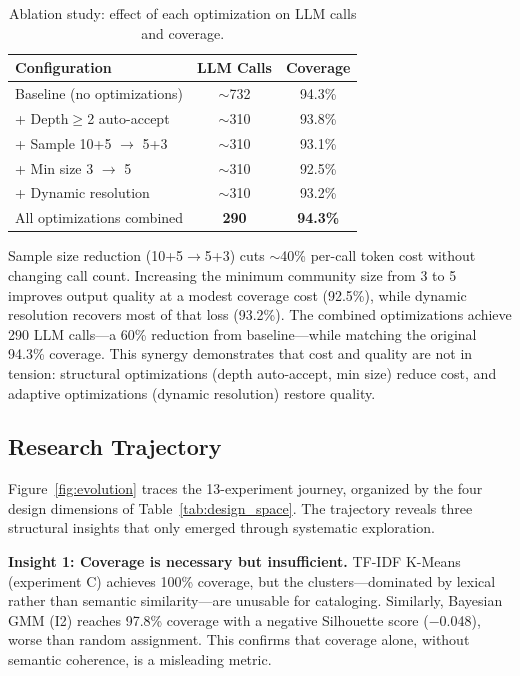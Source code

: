 \documentclass[10pt,twocolumn,twoside]{article}
\begin{document}
\begin{table}[h]
\centering
\caption{Ablation study: effect of each optimization on LLM calls and coverage.}
\label{tab:ablation}
\small
\begin{tabular}{lcc}
\toprule
Configuration & LLM Calls & Coverage \\
\midrule
Baseline (no optimizations) & $\sim$732 & 94.3\% \\
+ Depth$\geq$2 auto-accept & $\sim$310 & 93.8\% \\
+ Sample 10+5 $\rightarrow$ 5+3 & $\sim$310 & 93.1\% \\
+ Min size 3 $\rightarrow$ 5 & $\sim$310 & 92.5\% \\
+ Dynamic resolution & $\sim$310 & 93.2\% \\
All optimizations combined & \textbf{290} & \textbf{94.3\%} \\
\bottomrule
\end{tabular}
\end{table}

Sample size reduction (10+5$\rightarrow$5+3) cuts $\sim$40\% per-call token 
cost without changing call count. Increasing the minimum community size from 3 to 5 improves 
output quality at a modest coverage cost (92.5\%), while dynamic resolution recovers most of 
that loss (93.2\%). The combined optimizations achieve 290 LLM calls---a 60\% reduction from 
baseline---while matching the original 94.3\% coverage. This synergy demonstrates that cost 
and quality are not in tension: structural optimizations (depth auto-accept, min size) reduce 
cost, and adaptive optimizations (dynamic resolution) restore quality.

\subsection{Research Trajectory}

Figure~\ref{fig:evolution} traces the 13-experiment journey, organized by the four design 
dimensions of Table~\ref{tab:design_space}. The trajectory reveals three structural insights 
that only emerged through systematic exploration.

\textbf{Insight 1: Coverage is necessary but insufficient.} TF-IDF K-Means (experiment C) 
achieves 100\% coverage, but the clusters---dominated by lexical rather than semantic 
similarity---are unusable for cataloging. Similarly, Bayesian GMM (I2) reaches 97.8\% 
coverage with a negative Silhouette score ($-$0.048), worse than random assignment. This 
confirms that coverage alone, without semantic coherence, is a misleading metric.
\end{document}

